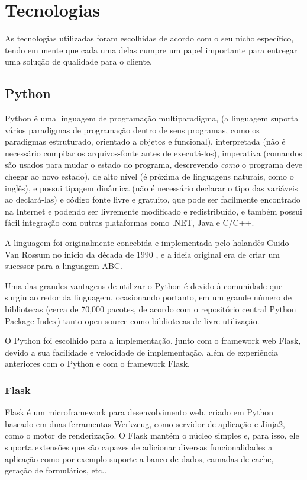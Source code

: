 \documentclass[
	article,			%
	11pt,				%
	oneside,			%
	a4paper,			%
	english,			%
	brazil,				%
	sumario=tradicional
	]{abntex2}
\begin{document}
\section{Tecnologias}

As tecnologias utilizadas foram escolhidas de acordo com o seu nicho específico, tendo em mente que cada uma delas cumpre um papel importante para entregar uma solução de qualidade para o cliente.

\subsection{Python}

Python é uma linguagem de programação multiparadigma, (a linguagem suporta vários paradigmas de programação dentro de seus programas, como os paradigmas estruturado, orientado a objetos e funcional), interpretada (não é necessário compilar os arquivos-fonte antes de executá-los), imperativa (comandos são usados para mudar o estado do programa, descrevendo \textit{como} o programa deve chegar ao novo estado), de alto nível (é próxima de linguagens naturais, como o inglês), e possui tipagem dinâmica (não é necessário declarar o tipo das variáveis ao declará-las) e código fonte livre \cite{pythonlicense} e gratuito, que pode ser facilmente encontrado na Internet e podendo ser livremente modificado e redistribuído, e também possui fácil integração com outras plataformas como .NET, Java e C/C++.

A linguagem foi originalmente concebida e implementada pelo holandês Guido Van Rossum no início da década de 1990 \cite{pythonlicense}, e a ideia original era de criar um sucessor para a linguagem ABC.

Uma das grandes vantagens de utilizar o Python é devido à comunidade que surgiu ao redor da linguagem, ocasionando portanto, em um grande número de bibliotecas (cerca de 70,000 pacotes, de acordo com o repositório central Python Package Index)\cite{pypi} tanto open-source como bibliotecas de livre utilização.

O Python foi escolhido para a implementação, junto com o framework web Flask, devido a sua facilidade e velocidade de implementação, além de experiência anteriores com o Python e com o framework Flask.

\subsubsection{Flask}

Flask é um microframework para desenvolvimento web, criado em Python baseado em duas ferramentas Werkzeug, como servidor de aplicação e Jinja2, como o motor de renderização.
O Flask mantém o núcleo simples e, para isso, ele suporta extensões que são capazes de adicionar diversas funcionalidades a aplicação como por exemplo suporte a banco de dados, camadas de cache, geração de formulários, etc.. \cite{flask}
\end{document}
